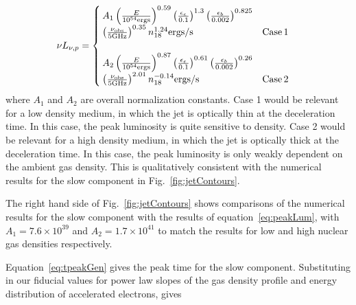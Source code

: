 \documentclass[usenatbib,fleqn]{mnras}
\begin{document}
\begin{align}
\nu L_{\nu, p}&=
\begin{cases}
  A_1 \left(\frac{E}{10^{54} {\rm ergs}}\right)^{0.59}
  \left(\frac{\epsilon_e}{0.1}\right)^{1.3}
  \left(\frac{\epsilon_b}{0.002}\right)^{0.825}\\
  \left(\frac{\nu_{\rm obs}}{5 {\rm GHz}}\right)^{0.35} n_{18}^{1.24} {\rm ergs/s} & {\rm Case \,1}\\\\
  A_2 \left(\frac{E}{10^{54} {\rm ergs}}\right)^{0.87}
  \left(\frac{\epsilon_e}{0.1}\right)^{0.61}
  \left(\frac{\epsilon_b}{0.002}\right)^{0.26}\\
  \left(\frac{\nu_{\rm obs}}{5 {\rm GHz}}\right)^{2.01} n_{18}^{-0.14}
  {\rm ergs/s} & {\rm Case \,2}
\end{cases}
\label{eq:peakLum}
\end{align}
%
where $A_1$ and $A_2$ are overall normalization constants.  Case 1
would be relevant for a low density medium, in which the jet is
optically thin at the deceleration time. In this case, the peak luminosity
is quite sensitive to density. Case 2 would be relevant for a high
density medium, in which the jet is optically thick at the
deceleration time. In this case, the peak luminosity is only weakly
dependent on the ambient gas density. This is qualitatively consistent
with the numerical results for the slow component in
Fig.~\ref{fig:jetContours}.

The right hand side of Fig.~\ref{fig:jetContours} shows comparisons of
the numerical results for the slow component with the results of
equation~\eqref{eq:peakLum}, with $A_1=7.6\times 10^{39}$ and $A_2=1.7
\times 10^{41}$ to match the results for low and high nuclear gas
densities respectively.

Equation~\eqref{eq:tpeakGen} gives the peak time for the slow
component. Substituting in our fiducial values for power law slopes of
the gas density profile and energy distribution of accelerated
electrons, gives
\end{document}
